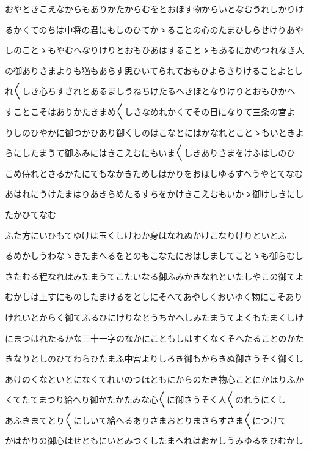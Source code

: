 \documentclass[a4paper,11pt,landscape]{ltjtarticle}
\begin{document}
\par\medskip
おやときこえなからもありかたからむをとおほす物からいとなむうれしかりけ
\par\medskip
るかくてのちは中将の君にもしのひてかゝることの心のたまひしらせけりあや
\par\medskip
しのことゝもやむへなりけりとおもひあはすることゝもあるにかのつれなき人
\par\medskip
の御ありさまよりも猶もあらす思ひいてられておもひよらさりけることよとし
\par\medskip
れ〱しき心ちすされとあるましうねちけたるへきほとなりけりとおもひかへ
\par\medskip
すことこそはありかたきまめ〱しさなめれかくてその日になりて三条の宮よ
\par\medskip
りしのひやかに御つかひあり御くしのはこなとにはかなれとことゝもいときよ
\par\medskip
らにしたまうて御ふみにはきこえむにもいま〱しきありさまをけふはしのひ
\par\medskip
こめ侍れとさるかたにてもなかきためしはかりをおほしゆるすへうやとてなむ
\par\medskip
あはれにうけたまはりあきらめたるすちをかけきこえむもいかゝ御けしきにし
\par\medskip
たかひてなむ
\par\medskip
ふた方にいひもてゆけは玉くしけわか身はなれぬかけこなりけりといとふ
\par\medskip
るめかしうわなゝきたまへるをとのもこなたにおはしましてことゝも御らむし
\par\medskip
さたむる程なれはみたまうてこたいなる御ふみかきなれといたしやこの御てよ
\par\medskip
むかしは上すにものしたまけるをとしにそへてあやしくおいゆく物にこそあり
\par\medskip
けれいとからく御てふるひにけりなとうちかへしみたまうてよくもたまくしけ
\par\medskip
にまつはれたるかな三十一字のなかにこともしはすくなくそへたることのかた
\par\medskip
きなりとしのひてわらひたまふ中宮よりしろき御もからきぬ御さうそく御くし
\par\medskip
あけのくなといとになくてれいのつほともにからのたき物心ことにかほりふか
\par\medskip
くてたてまつり給へり御かたかたみな心〱に御さうそく人〱のれうにくし
\par\medskip
あふきまてとり〱にしいて給へるありさまおとりまさらすさま〱につけて
\par\medskip
かはかりの御心はせともにいとみつくしたまへれはおかしうみゆるをひむかし
\end{document}
